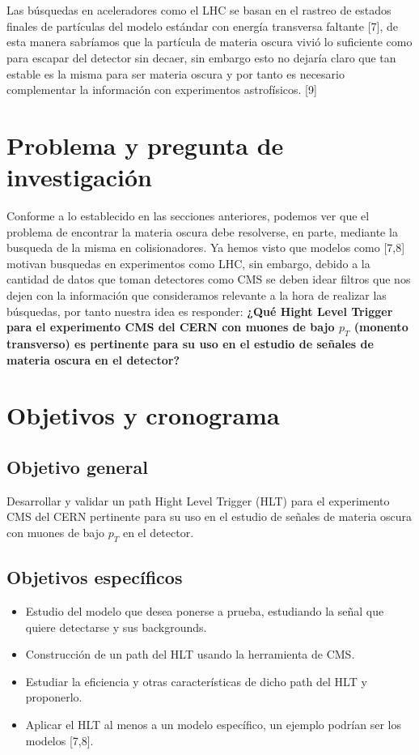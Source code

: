 \\
\\
Las búsquedas en aceleradores como el LHC se basan en el rastreo de estados finales de partículas del modelo estándar con energía transversa faltante [7], de esta manera sabríamos que la partícula de materia oscura vivió lo suficiente como para escapar del detector sin decaer, sin embargo esto no dejaría claro que tan estable es la misma para ser materia oscura y por tanto es necesario complementar la información con experimentos astrofísicos. [9]
\newpage
\section{Problema y pregunta de investigación}

	Conforme a lo establecido en las secciones anteriores, podemos ver que el problema de encontrar la materia oscura debe resolverse, en parte, mediante la busqueda de la misma en colisionadores. Ya hemos visto que modelos como [7,8] motivan busquedas en experimentos como LHC, sin embargo, debido a la cantidad de datos que toman detectores como CMS se deben idear filtros que nos dejen con la información que consideramos relevante a la hora de realizar las búsquedas, por tanto nuestra idea es responder: \textbf{¿Qué Hight Level Trigger para el experimento CMS del CERN con muones de bajo $p_T$ (monento transverso) es pertinente para su uso en el estudio de señales de materia oscura en el detector?}


\newpage
\section{Objetivos y cronograma}


\subsection{Objetivo general}

Desarrollar y validar un path Hight Level Trigger (HLT) para el experimento CMS del CERN pertinente para su uso en el estudio de señales de materia oscura con muones de bajo $p_T$ en el detector.

\subsection{Objetivos específicos}

\begin{itemize}
	\item Estudio del modelo que desea ponerse a prueba, estudiando la señal que quiere detectarse y sus backgrounds.
	\item Construcción de un path del HLT usando la herramienta de CMS.
	\item Estudiar la eficiencia y otras características de dicho path del HLT y proponerlo.
	\item Aplicar el HLT al menos a un modelo específico, un ejemplo podrían ser los modelos [7,8].
\end{itemize}


